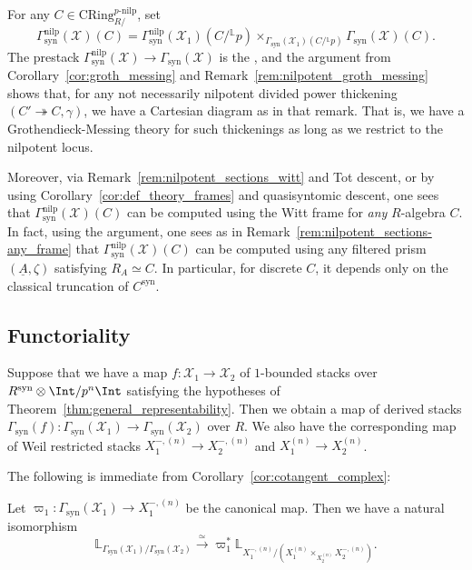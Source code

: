 \documentclass[10pt]{amsart}
\begin{document}
\begin{remark}
\label{rem:nilpotent_locus_general}
For any $C\in \mathrm{CRing}^{p\text{-nilp}}_{R/}$, set
\[
\Gamma^{\mathrm{nilp}}_{\mathrm{syn}}(\mathcal{X})(C) = \Gamma^{\mathrm{nilp}}_{\mathrm{syn}}(\mathcal{X}_1)(C/{}^{\mathbb{L}}p)\times_{\Gamma_{\mathrm{syn}}(\mathcal{X}_1)(C/{}^{\mathbb{L}}p)}\Gamma_{\mathrm{syn}}(\mathcal{X})(C).
\]
The prestack $\Gamma^{\mathrm{nilp}}_{\mathrm{syn}}(\mathcal{X})\to \Gamma_{\mathrm{syn}}(\mathcal{X})$ is the , and the argument from Corollary~\ref{cor:groth_messing} and Remark~\ref{rem:nilpotent_groth_messing} shows that, for any not necessarily nilpotent divided power thickening $(C'\twoheadrightarrow C,\gamma)$, we have a Cartesian diagram as in that remark. That is, we have a Grothendieck-Messing theory for such thickenings as long as we restrict to the nilpotent locus.

Moreover, via Remark~\ref{rem:nilpotent_sections_witt} and Tot descent, or by using Corollary~\ref{cor:def_theory_frames} and quasisyntomic descent, one sees that $\Gamma^{\mathrm{nilp}}_{\mathrm{syn}}(\mathcal{X})(C)$ can be computed using the Witt frame for \emph{any} $R$-algebra $C$. In fact, using the argument, one sees as in Remark~\ref{rem:nilpotent_sections-any_frame} that $\Gamma^{\mathrm{nilp}}_{\mathrm{syn}}(\mathcal{X})(C)$ can be computed using any filtered prism $(\underline{A},\zeta)$ satisfying $R_A\simeq C$. In particular, for discrete $C$, it depends only on the classical truncation of $C^{\mathrm{syn}}$.
\end{remark}  

\subsection{Functoriality}

Suppose that we have a map $f:\mathcal{X}_1\to \mathcal{X}_2$ of $1$-bounded stacks over $R^{\mathrm{syn}}\otimes\Int/p^n\Int$ satisfying the hypotheses of Theorem~\ref{thm:general_representability}. Then we obtain a map of derived stacks $\Gamma_{\mathrm{syn}}(f):\Gamma_{\mathrm{syn}}(\mathcal{X}_1)\to \Gamma_{\mathrm{syn}}(\mathcal{X}_2)$ over $R$. We also have the corresponding map of Weil restricted stacks $X_1^{-,(n)}\to X_2^{-,(n)}$ and $X_1^{(n)}\to X_2^{(n)}$.

The following is immediate from Corollary~\ref{cor:cotangent_complex}:
\begin{proposition}
\label{prop:relative_cotangent_complex}
Let $\varpi_1:\Gamma_{\mathrm{syn}}(\mathcal{X}_1)\to X_1^{-,(n)}$ be the canonical map. Then we have a natural isomorphism
\[
\mathbb{L}_{\Gamma_{\mathrm{syn}}(\mathcal{X}_1)/\Gamma_{\mathrm{syn}}(\mathcal{X}_2)}\xrightarrow{\simeq}\varpi_1^*\mathbb{L}_{X_1^{-,(n)}/(X_1^{(n)}\times_{X_2^{(n)}}X_2^{-,(n)})}.
\]
\end{proposition} 
\end{document}
